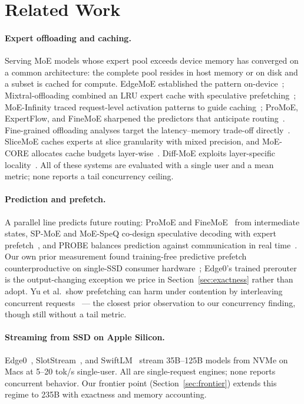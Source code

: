 \documentclass[11pt]{article}
\begin{document}
\section{Related Work}
\label{sec:related}

\paragraph{Expert offloading and caching.}
Serving MoE models whose expert pool exceeds device memory has converged on
a common architecture: the complete pool resides in host memory or on disk
and a subset is cached for compute. EdgeMoE established the pattern
on-device~\cite{edgemoe}; Mixtral-offloading combined an LRU expert cache
with speculative prefetching~\cite{mixtraloffloading}; MoE-Infinity traced
request-level activation patterns to guide caching~\cite{moeinfinity};
ProMoE, ExpertFlow, and FineMoE sharpened the predictors that anticipate
routing~\cite{promoe,expertflow,finemoe}. Fine-grained offloading analyses
target the latency--memory trade-off directly~\cite{finemoe}. SliceMoE
caches experts at slice granularity with mixed precision, and MoE-CORE
allocates cache budgets layer-wise~\cite{slicemoe,moecore}. Diff-MoE
exploits layer-specific locality~\cite{diffmoe}. All of these systems are
evaluated with a single user and a mean metric; none reports a tail
concurrency ceiling.

\paragraph{Prediction and prefetch.}
A parallel line predicts future routing: ProMoE and
FineMoE~\cite{promoe,finemoe} from intermediate states, SP-MoE and
MoE-SpeQ co-design speculative decoding with expert
prefetch~\cite{spmoe,moespeq}, and PROBE balances prediction against
communication in real time~\cite{probe}. Our own prior measurement found
training-free predictive prefetch counterproductive on single-SSD consumer
hardware~\cite{hariri2026pinning}; Edge0's trained prerouter is the
output-changing exception we price in Section~\ref{sec:exactness} rather
than adopt. Yu et al.\ show prefetching can harm under contention by
interleaving concurrent requests~\cite{interleaving} --- the closest prior
observation to our concurrency finding, though still without a tail metric.

\paragraph{Streaming from SSD on Apple Silicon.}
Edge0~\cite{edge0}, SlotStream~\cite{slotstream}, and
SwiftLM~\cite{swiftlm} stream 35B--125B models from NVMe on Macs at
5--20 tok/s single-user. All are single-request engines; none reports
concurrent behavior. Our frontier point (Section~\ref{sec:frontier}) extends
this regime to 235B with exactness and memory accounting.
\end{document}

